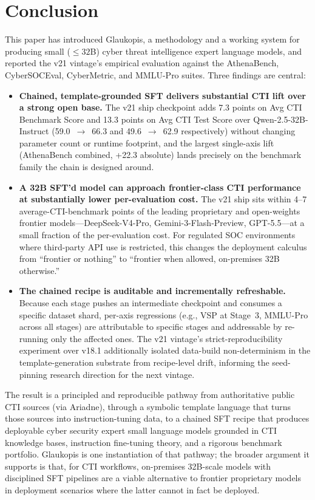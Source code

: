 \documentclass[unnumsec,webpdf,contemporary,large]{oup-authoring-template}
\theoremstyle{thmstyleone}
\theoremstyle{thmstyletwo}
\theoremstyle{thmstylethree}
\begin{document}
\section{Conclusion}

This paper has introduced Glaukopis, a methodology and a working system for producing small ($\le 32$B) cyber threat intelligence expert language models, and reported the v21 vintage's empirical evaluation against the AthenaBench, CyberSOCEval, CyberMetric, and MMLU-Pro suites. Three findings are central:

\begin{itemize}
  \item \textbf{Chained, template-grounded SFT delivers substantial CTI lift over a strong open base.} The v21 ship checkpoint adds 7.3 points on Avg CTI Benchmark Score and 13.3 points on Avg CTI Test Score over Qwen-2.5-32B-Instruct (59.0~$\to$~66.3 and 49.6~$\to$~62.9 respectively) without changing parameter count or runtime footprint, and the largest single-axis lift (AthenaBench combined, +22.3 absolute) lands precisely on the benchmark family the chain is designed around.
  \item \textbf{A 32B SFT'd model can approach frontier-class CTI performance at substantially lower per-evaluation cost.} The v21 ship sits within 4--7 average-CTI-benchmark points of the leading proprietary and open-weights frontier models---DeepSeek-V4-Pro, Gemini-3-Flash-Preview, GPT-5.5---at a small fraction of the per-evaluation cost. For regulated SOC environments where third-party API use is restricted, this changes the deployment calculus from ``frontier or nothing'' to ``frontier when allowed, on-premises 32B otherwise.''
  \item \textbf{The chained recipe is auditable and incrementally refreshable.} Because each stage pushes an intermediate checkpoint and consumes a specific dataset shard, per-axis regressions (e.g., VSP at Stage~3, MMLU-Pro across all stages) are attributable to specific stages and addressable by re-running only the affected ones. The v21 vintage's strict-reproducibility experiment over v18.1 additionally isolated data-build non-determinism in the template-generation substrate from recipe-level drift, informing the seed-pinning research direction for the next vintage.
\end{itemize}

The result is a principled and reproducible pathway from authoritative public CTI sources (via Ariadne), through a symbolic template language that turns those sources into instruction-tuning data, to a chained SFT recipe that produces deployable cyber security expert small language models grounded in CTI knowledge bases, instruction fine-tuning theory, and a rigorous benchmark portfolio. Glaukopis is one instantiation of that pathway; the broader argument it supports is that, for CTI workflows, on-premises 32B-scale models with disciplined SFT pipelines are a viable alternative to frontier proprietary models in deployment scenarios where the latter cannot in fact be deployed.
\end{document}
